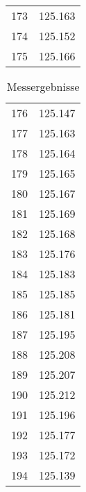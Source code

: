 \begin{multicols}{3}
\begin{table}[H]
\begin{tabular}{|c|c|}
            173 & 125.163 \\
            174 & 125.152 \\
            175 & 125.166 \\
            \hline
        \end{tabular}
    \end{table}
    \columnbreak
    \begin{table}[H]
        \centering
        \begin{tabular}{|c|c|}
            \hline
            176 & 125.147 \\
            177 & 125.163 \\
            178 & 125.164 \\
            179 & 125.165 \\
            180 & 125.167 \\
            181 & 125.169 \\
            182 & 125.168 \\
            183 & 125.176 \\
            184 & 125.183 \\
            185 & 125.185 \\
            186 & 125.181 \\
            187 & 125.195 \\
            188 & 125.208 \\
            189 & 125.207 \\
            190 & 125.212 \\
            191 & 125.196 \\
            192 & 125.177 \\
            193 & 125.172 \\
            194 & 125.139 \\
            \hline
        \end{tabular}
        \caption{Messergebnisse}
    \end{table}
    
    \end{multicols}